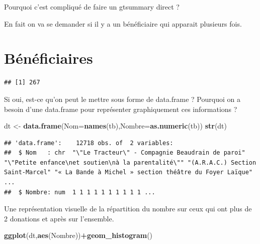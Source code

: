 \documentclass[
]{book}
\newenvironment{Shaded}{\begin{snugshade}}{\end{snugshade}}
\newcommand{\AttributeTok}[1]{\textcolor[rgb]{0.13,0.29,0.53}{#1}}
\newcommand{\DecValTok}[1]{\textcolor[rgb]{0.00,0.00,0.81}{#1}}
\newcommand{\FunctionTok}[1]{\textcolor[rgb]{0.13,0.29,0.53}{\textbf{#1}}}
\newcommand{\NormalTok}[1]{#1}
\newcommand{\OtherTok}[1]{\textcolor[rgb]{0.56,0.35,0.01}{#1}}
\newcommand{\SpecialCharTok}[1]{\textcolor[rgb]{0.81,0.36,0.00}{\textbf{#1}}}
\begin{document}
Pourquoi c'est compliqué de faire un gtsummary direct ?

En fait on va se demander si il y a un bénéficiaire qui apparait plusieurs fois.

\hypertarget{buxe9nuxe9ficiaires}{%
\section{Bénéficiaires}\label{buxe9nuxe9ficiaires}}

\begin{Shaded}
\end{Shaded}

\begin{verbatim}
## [1] 267
\end{verbatim}

Si oui, est-ce qu'on peut le mettre sous forme de data.frame ? Pourquoi on a
besoin d'une data.frame pour représenter graphiquement ces informations ?

\begin{Shaded}
\begin{Highlighting}[]
\NormalTok{dt }\OtherTok{\textless{}{-}} \FunctionTok{data.frame}\NormalTok{(}\AttributeTok{Nom=}\FunctionTok{names}\NormalTok{(tb),}\AttributeTok{Nombre=}\FunctionTok{as.numeric}\NormalTok{(tb))}
\FunctionTok{str}\NormalTok{(dt)}
\end{Highlighting}
\end{Shaded}

\begin{verbatim}
## 'data.frame':    12718 obs. of  2 variables:
##  $ Nom   : chr  "\"Le Tracteur\" - Compagnie Beaudrain de paroi" "\"Petite enfance\net soutien\nà la parentalité\"" "(A.R.A.C.) Section Saint-Marcel" "« La Bande à Michel » section théâtre du Foyer Laïque" ...
##  $ Nombre: num  1 1 1 1 1 1 1 1 1 1 ...
\end{verbatim}

Une représentation visuelle de la répartition du nombre sur ceux qui ont plus de
2 donations et après sur l'ensemble.

\begin{Shaded}
\begin{Highlighting}[]
\FunctionTok{ggplot}\NormalTok{(dt,}\FunctionTok{aes}\NormalTok{(Nombre))}\SpecialCharTok{+}\FunctionTok{geom\_histogram}\NormalTok{()}
\end{Highlighting}
\end{Shaded}
\end{document}
